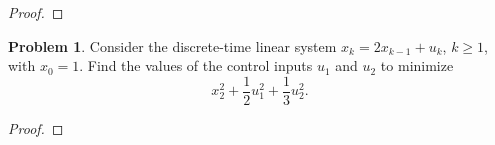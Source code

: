 \documentclass[12pt]{article}
\theoremstyle{definition}
\newtheorem{problem}{Problem}
\begin{document}
\begin{proof}
\end{proof}
\newpage


\begin{problem}
  Consider the discrete-time linear system $x_k = 2 x_{k-1} + u_k$, $k \geq 1$, with
  $x_0 = 1$. Find the values of the control inputs $u_1$ and $u_2$ to minimize
  $$x_2^2 + \frac{1}{2}u_1^2+ \frac{1}{3}u_2^2.$$
\end{problem}

\begin{proof}
\end{proof}
\end{document}
